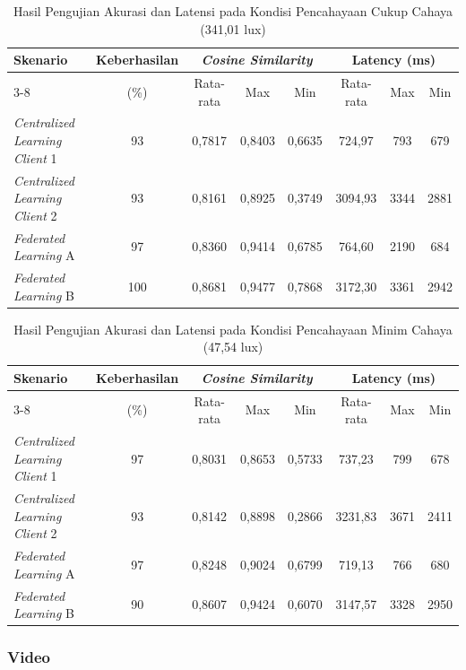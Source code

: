 \begin{table}[H]
  \centering
  \caption{Hasil Pengujian Akurasi dan Latensi pada Kondisi Pencahayaan Cukup Cahaya (341,01 lux)}
  \label{tab:akurasi-latensi-cukup}
  \begin{tabular}{|l|c|c|c|c|c|c|c|}
    \hline
    Skenario & Keberhasilan & \multicolumn{3}{c|}{\textit{Cosine Similarity}} & \multicolumn{3}{c|}{Latency (ms)} \\
    \cline{3-8}
    & (\%) & Rata-rata & Max & Min & Rata-rata & Max & Min \\
    \hline
    \textit{Centralized Learning Client} 1 & 93 & 0,7817 & 0,8403 & 0,6635 & 724,97 & 793 & 679 \\
    \textit{Centralized Learning Client} 2 & 93 & 0,8161 & 0,8925 & 0,3749 & 3094,93 & 3344 & 2881 \\
    \textit{Federated Learning} A & 97 & 0,8360 & 0,9414 & 0,6785 & 764,60 & 2190 & 684 \\
    \textit{Federated Learning} B & 100 & 0,8681 & 0,9477 & 0,7868 & 3172,30 & 3361 & 2942 \\
    \hline
  \end{tabular}
\end{table}

\begin{table}[H]
  \centering
  \caption{Hasil Pengujian Akurasi dan Latensi pada Kondisi Pencahayaan Minim Cahaya (47,54 lux)}
  \label{tab:akurasi-latensi-minim}
  \begin{tabular}{|l|c|c|c|c|c|c|c|}
    \hline
    Skenario & Keberhasilan & \multicolumn{3}{c|}{\textit{Cosine Similarity}} & \multicolumn{3}{c|}{Latency (ms)} \\
    \cline{3-8}
    & (\%) & Rata-rata & Max & Min & Rata-rata & Max & Min \\
    \hline
    \textit{Centralized Learning Client} 1 & 97 & 0,8031 & 0,8653 & 0,5733 & 737,23 & 799 & 678 \\
    \textit{Centralized Learning Client} 2 & 93 & 0,8142 & 0,8898 & 0,2866 & 3231,83 & 3671 & 2411 \\
    \textit{Federated Learning} A & 97 & 0,8248 & 0,9024 & 0,6799 & 719,13 & 766 & 680 \\
    \textit{Federated Learning} B & 90 & 0,8607 & 0,9424 & 0,6070 & 3147,57 & 3328 & 2950 \\
    \hline
  \end{tabular}
\end{table}

\subsubsection{Video}

